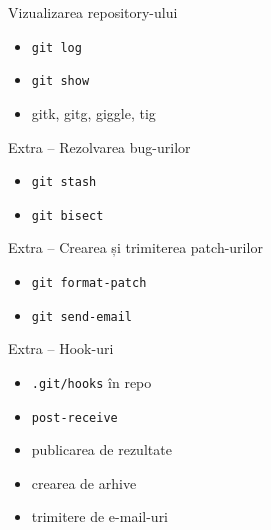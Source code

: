 \documentclass{beamer}
\begin{document}
\begin{frame}{Vizualizarea repository-ului}
  \begin{itemize}
    \item \texttt{git log}
    \item \texttt{git show}
    \item gitk, gitg, giggle, tig
  \end{itemize}
\end{frame}

\begin{frame}{Extra -- Rezolvarea bug-urilor}
  \begin{itemize}
    \item \texttt{git stash}
    \item \texttt{git bisect}
  \end{itemize}
\end{frame}

\begin{frame}{Extra -- Crearea și trimiterea patch-urilor}
  \begin{itemize}
    \item \texttt{git format-patch}
    \item \texttt{git send-email}
  \end{itemize}
\end{frame}

\begin{frame}{Extra -- Hook-uri}
  \begin{itemize}
    \item \texttt{.git/hooks} în repo
    \item \texttt{post-receive}
    \item publicarea de rezultate
    \item crearea de arhive
    \item trimitere de e-mail-uri
  \end{itemize}
\end{frame}
\end{document}
